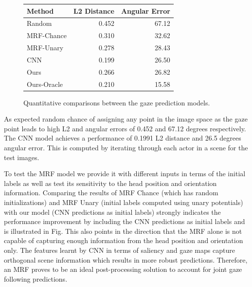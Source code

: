 \documentclass[10pt,twocolumn,letterpaper]{article}
\begin{document}
\begin{figure}[H]
  \begin{center}
    \begin{tabular}{|l|r|r|}
      \hline
      Method & L2 Distance & Angular Error \\
      \hline
      Random & 0.452 & 67.12 \\
      MRF-Chance & 0.310 & 32.62 \\
      MRF-Unary & 0.278 & 28.43 \\
      CNN & 0.199 & 26.50 \\
      Ours & 0.266 & 26.82 \\
      Ours-Oracle & 0.210 & 15.58 \\
      \hline
    \end{tabular}
  \end{center}
  \vspace{-0.3cm}
   \caption{Quantitative comparisons between the gaze prediction models.}
  \vspace{-0.5cm}
\end{figure}

\vspace{3ex}
As expected random chance of assigning any point in the image space as the gaze point leads to high L2 and angular errors of 0.452 and 67.12 degrees respectively.  The CNN model achieves a performance of 0.1991 L2 distance and 26.5 degrees angular error. This is computed by iterating through each actor in a scene for the test images.

To test the MRF model we provide it with different inputs in terms of the initial labels as well as test its sensitivity to the head position and orientation information.  Comparing the results of MRF Chance (which has random initializations) and MRF Unary (initial labels computed using unary potentials)  with our model (CNN predictions as initial labels) strongly indicates the performance improvement by including the CNN predictions as initial labels and is illustrated in Fig. This also points in the direction that the MRF alone is not capable of capturing enough information from the head position and orientation only. The features learnt by CNN in terms of saliency and gaze maps capture orthogonal scene information which results in more robust predictions. Therefore, an MRF proves to be an ideal post-processing solution to account for joint gaze following predictions.
\end{document}
